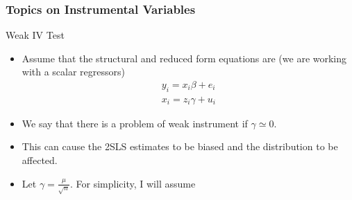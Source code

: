 \documentclass{beamer}
\begin{document}
\begin{frame}
\frametitle{Topics on Instrumental Variables}
Weak IV Test
\begin{itemize}
\item Assume that the structural and reduced form equations are (we are working with a scalar regressors)
\begin{gather*}
y_i = x_i\beta+ e_i \\ x_i=z_i\gamma+u_i
\end{gather*}
\item We say that there is a problem of weak instrument if $\gamma\simeq0$.
\item  This can cause the 2SLS estimates to be biased and the distribution to be affected. 
\item Let $\gamma=\frac{\mu}{\sqrt{n}}$. For simplicity, I will assume
\end{itemize}
\end{frame}
\end{document}

